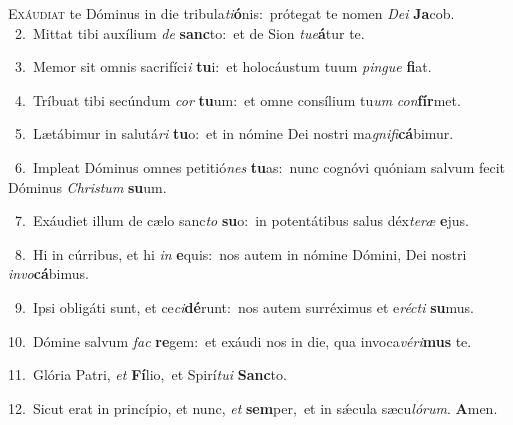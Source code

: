 \lettrine{\initial\textcolor{\initialcolor}{E}}{xáudiat} te Dóminus in die tribula\-\textit{ti}\-\textbf{ó}nis:~\star prótegat te nomen \textit{De}\-\textit{i} \textbf{Ja}\-cob.\\
{\numbfont\textcolor{\numbcolor}{~2.}}~Mittat tibi auxílium \textit{de} \textbf{sanc}\-to:~\star et de Sion \textit{tu}\-\textit{e}\textbf{á}tur te.\par
{\numbfont\textcolor{\numbcolor}{~3.}}~Memor sit omnis sacrifíci\textit{i} \textbf{tu}\-i:~\star et holocáustum tuum \textit{pin}\-\textit{gue} \textbf{fi}\-at.\par
{\numbfont\textcolor{\numbcolor}{~4.}}~Tríbuat tibi secúndum \textit{cor} \textbf{tu}\-um:~\star et omne consílium tu\textit{um} \textit{con}\-\textbf{fír}met.\par
{\numbfont\textcolor{\numbcolor}{~5.}}~Lætábimur in salutá\textit{ri} \textbf{tu}\-o:~\star et in nómine Dei nostri ma\-\textit{gni}\-\textit{fi}\textbf{cá}bimur.\par
{\numbfont\textcolor{\numbcolor}{~6.}}~Impleat Dóminus omnes petitió\textit{nes} \textbf{tu}\-as:~\star nunc cognóvi quóniam salvum fecit Dóminus \textit{Chris}\-\textit{tum} \textbf{su}\-um.\par
{\numbfont\textcolor{\numbcolor}{~7.}}~Exáudiet illum de cælo sanc\textit{to} \textbf{su}\-o:~\star in potentátibus salus déx\-\textit{te}\-\textit{ræ} \textbf{e}\-jus.\par
{\numbfont\textcolor{\numbcolor}{~8.}}~Hi in cúrribus, et hi \textit{in} \textbf{e}\-quis:~\star nos autem in nómine Dómini, Dei nostri \textit{in}\-\textit{vo}\textbf{cá}bimus.\par
{\numbfont\textcolor{\numbcolor}{~9.}}~Ipsi obligáti sunt, et ce\-\textit{ci}\-\textbf{dé}runt:~\star nos autem surréximus et e\-\textit{réc}\-\textit{ti} \textbf{su}\-mus.\par
{\numbfont\textcolor{\numbcolor}{10.}}~Dómine salvum \textit{fac} \textbf{re}\-gem:~\star et exáudi nos in die, qua invoca\-\textit{vé}\-\textit{ri}\textbf{mus} te.\par
{\numbfont\textcolor{\numbcolor}{11.}}~Glória Patri, \textit{et} \textbf{Fí}\-lio,~\star et Spirí\-\textit{tu}\-\textit{i} \textbf{Sanc}\-to.\par
{\numbfont\textcolor{\numbcolor}{12.}}~Sicut erat in princípio, et nunc, \textit{et} \textbf{sem}\-per,~\star et in sǽcula sæcu\-\textit{ló}\-\textit{rum}. \textbf{A}\-men.\par
